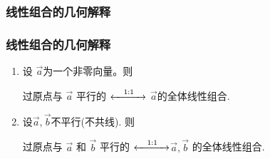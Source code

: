 \subsubsection{线性组合的几何解释}
\begin{frame}\frametitle{线性组合的几何解释}

\begin{center}
\end{center}
\pp
\bigskip

\begin{enumerate}
\item 设 $\vec{a}$为一个非零向量。则
\begin{center}
过原点与 $\vec{a}$ 平行的 \quad $\xleftrightarrow{\quad 1:1 \quad}$ \quad $\vec{a}$的全体线性组合.
\end{center}
\pp
\bigskip


\item 设$\vec{a},\vec{b}$不平行(不共线). 则
\begin{center}
过原点与 $\vec{a}$ 和 $\vec{b}$ 平行的 \quad $\xleftrightarrow{\quad 1:1 \quad}$\quad  $\vec{a},\vec{b}$ 的全体线性组合.
\end{center}
\end{enumerate}

\pp
\bigskip


\end{frame}








